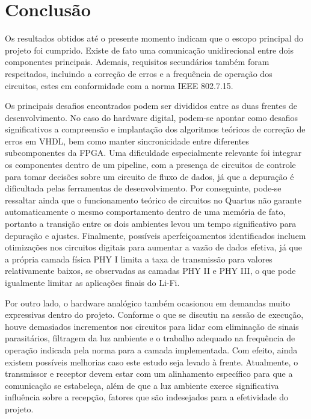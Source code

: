 	\chapter{Conclusão}\label{cap-conclusao}
	
	Os resultados obtidos até o presente momento indicam que o escopo principal do projeto foi cumprido. Existe de fato uma comunicação unidirecional entre dois componentes principais. Ademais, requisitos secundários também foram respeitados, incluindo a correção de erros e a frequência de operação dos circuitos, estes em conformidade com a norma IEEE 802.7.15. 
	
	Os principais desafios encontrados podem ser divididos entre as duas frentes de desenvolvimento. No caso do hardware digital, podem-se apontar como desafios significativos a compreensão e implantação dos algoritmos teóricos de correção de erros em VHDL, bem como manter sincronicidade entre diferentes subcomponentes da FPGA. Uma dificuldade especialmente relevante foi integrar os componentes dentro de um pipeline, com a presença de circuitos de controle para tomar decisões sobre um circuito de fluxo de dados, já que a depuração é dificultada pelas ferramentas de desenvolvimento. Por conseguinte, pode-se ressaltar ainda que o funcionamento teórico de circuitos no Quartus não garante automaticamente o mesmo comportamento dentro de uma memória de fato, portanto a transição entre os dois ambientes levou um tempo significativo para depuração e ajustes. Finalmente, possíveis aperfeiçoamentos identificados incluem otimizações nos circuitos digitais para aumentar a vazão de dados efetiva, já que a própria camada física PHY I limita a taxa de transmissão para valores relativamente baixos, se observadas as camadas PHY II e PHY III, o que pode igualmente limitar as aplicações finais do Li-Fi.
	
	Por outro lado, o hardware analógico também ocasionou em demandas muito expressivas dentro do projeto. Conforme o que se discutiu na sessão de execução, houve demasiados incrementos nos circuitos para lidar com eliminação de sinais parasitários, filtragem da luz ambiente e o trabalho adequado na frequência de operação indicada pela norma para a camada implementada. Com efeito, ainda existem possíveis melhorias caso este estudo seja levado à frente. Atualmente, o transmissor e receptor devem estar com um alinhamento específico para que a comunicação se estabeleça, além de que a luz ambiente exerce significativa influência sobre a recepção, fatores que são indesejados para a efetividade do projeto.
	
